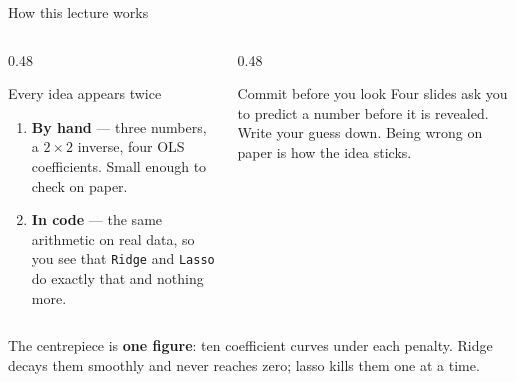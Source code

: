 \documentclass[aspectratio=169]{beamer}
\begin{document}
\begin{frame}[shrink=6]{How this lecture works}
  \begin{columns}[T]
    \begin{column}{0.48\textwidth}
      \begin{block}{Every idea appears twice}
        \begin{enumerate}
          \item \textbf{By hand} --- three numbers, a $2\times2$ inverse, four
            OLS coefficients. Small enough to check on paper.
          \item \textbf{In code} --- the same arithmetic on real data, so you
            see that \texttt{Ridge} and \texttt{Lasso} do exactly that and
            nothing more.
        \end{enumerate}
      \end{block}
    \end{column}
    \begin{column}{0.48\textwidth}
      \begin{alertblock}{Commit before you look}
        Four slides ask you to predict a number before it is revealed. Write
        your guess down. Being wrong on paper is how the idea sticks.
      \end{alertblock}
    \end{column}
  \end{columns}
  \vspace{0.4em}
  \begin{center}
    \small The centrepiece is \textbf{one figure}: ten coefficient curves
    under each penalty. Ridge decays them smoothly and never reaches zero;
    lasso kills them one at a time.
  \end{center}
\end{frame}
\end{document}
